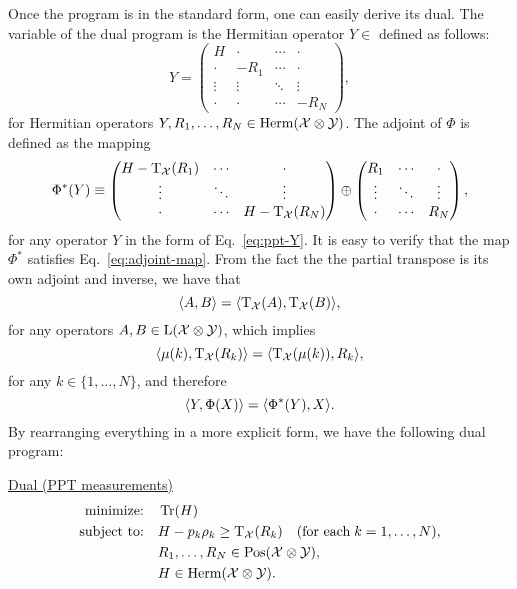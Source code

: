 Once the program is in the standard form, one can easily derive its dual.
The variable of the dual program is the Hermitian operator
$Y \in $ 
defined as follows:
\begin{equation}
\label{eq:ppt-Y}
  Y = 
  \begin{pmatrix}
      H & \cdot & \cdots & \cdot \\
        \cdot  & -R_{1} & \cdots & \cdot\\
        \vdots & \vdots & \ddots & \vdots\\
        \cdot  & \cdot & \cdots & -R_{N}
    \end{pmatrix},
\end{equation}
for Hermitian operators $Y, R_{1}, \ldots, R_{N} \in \mathrm{Herm}(\mathcal{X}\otimes\mathcal{Y})$.
The adjoint of $\Phi$ is defined as the mapping
\begin{equation}
  \Phi^{\ast}(Y) \equiv 
    \begin{pmatrix}
      H - \operatorname{T}_{\mathcal{X}}(R_{1}) & \cdots & \cdot\\
      \vdots & \ddots & \vdots\\
      \cdot & \cdots & H - \operatorname{T}_{\mathcal{X}}(R_{N})\\
    \end{pmatrix}
    \oplus
    \begin{pmatrix}
      R_{1} & \cdots & \cdot\\
      \vdots & \ddots & \vdots\\
      \cdot & \cdots & R_{N}\\
    \end{pmatrix},
\end{equation}
for any operator $Y$ in the form of Eq.~\eqref{eq:ppt-Y}.
It is easy to verify that the map $\Phi^{\ast}$ satisfies Eq.~\eqref{eq:adjoint-map}.
From the fact the the partial transpose is its own adjoint and inverse, we have 
that
\begin{equation}
  \langle A , B\rangle = \langle \operatorname{T}_{\mathcal{X}}(A) , \operatorname{T}_{\mathcal{X}}(B)\rangle,
\end{equation}
for any operators $A, B\in\mathrm{L}(\mathcal{X}\otimes\mathcal{Y})$, which implies
\begin{equation}
\langle \mu(k) , \operatorname{T}_{\mathcal{X}}(R_{k})\rangle = \langle \operatorname{T}_{\mathcal{X}}(\mu(k)) , R_{k}\rangle,
\end{equation}
for any $k \in \{1, \ldots, N\}$, and therefore
\begin{equation}
  \langle Y , \Phi(X)\rangle = \langle \Phi^{\ast}(Y) , X\rangle.
\end{equation}
By rearranging everything in a more explicit form, we have the following dual program:
\begin{center}
\underline{Dual (PPT measurements)}
\begin{equation}
  \label{eq:ppt-dual-problem}
  \begin{split}
    \text{minimize:} \quad & \operatorname{Tr}(H)\\
    \text{subject to:} \quad & H-p_k\rho_k \geq \operatorname{T}_{\mathcal{X}}(R_{k})
    \quad(\text{for each}\;k = 1,\ldots,N),\\
    \quad & R_{1}, \ldots, R_{N} \in \mathrm{Pos}(\mathcal{X}\otimes\mathcal{Y}),\\
    \quad & H \in \mathrm{Herm}(\mathcal{X}\otimes\mathcal{Y}).
  \end{split}
\end{equation}
\end{center}

